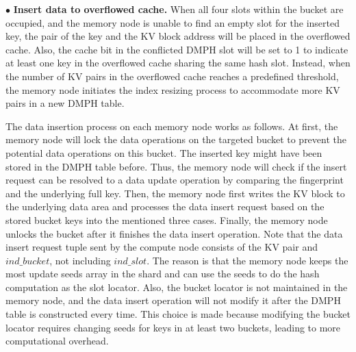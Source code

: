 $\bullet$ \textbf{Insert data to overflowed cache.}
When all four slots within the bucket are occupied, and the memory node is unable to find an empty slot for the inserted key, the pair of the key and the KV block address will be  placed in the overflowed cache. Also, the cache bit in the conflicted DMPH slot will be set to 1 to indicate at least one key in the overflowed cache sharing the same hash slot. 
Instead, when the number of KV pairs in the overflowed cache reaches a predefined threshold, the memory node initiates the index resizing process to accommodate more KV pairs in a new DMPH table.


The data insertion process on each memory node works as follows. 
At first, the memory node will lock the data operations on the targeted bucket
to prevent the potential data operations on this bucket. 
The inserted key might have been stored in the DMPH table before. Thus, the memory node will check if the insert request can be resolved to a data update operation by comparing the fingerprint and the underlying full key. %
Then, the memory node first writes the KV block to the underlying data area %
and processes the data insert request based on the stored bucket keys 
into the mentioned three cases. %
Finally, the memory node unlocks the bucket after it finishes the data insert operation.  
Note that the data insert request tuple sent by the compute node consists of the KV pair and $ind\_bucket$, not including $ind\_slot$. 
The reason is that the memory node keeps the most update seeds array in the shard and can use the seeds to do the hash computation as the slot locator. 
Also, the bucket locator is not maintained in the memory node, and the data insert operation will not modify it after the DMPH table is constructed every time.
This choice is made because modifying the bucket locator requires changing seeds for keys in at least two buckets, leading to more computational overhead. 

\vspace{-2.ex}
